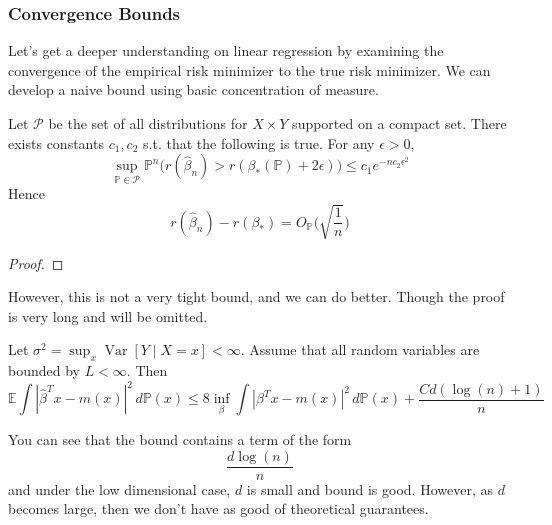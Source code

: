 \documentclass{article}
\DeclareMathOperator{\Var}{Var}
\begin{document}
    \subsubsection{Convergence Bounds} 

      Let's get a deeper understanding on linear regression by examining the convergence of the empirical risk minimizer to the true risk minimizer. We can develop a naive bound using basic concentration of measure. 

      \begin{theorem}
        Let $\mathcal{P}$ be the set of all distributions for $X \times Y$ supported on a compact set. There exists constants $c_1, c_2$ s.t. that the following is true. For any $\epsilon > 0$, 
        \begin{equation}
          \sup_{\mathbb{P} \in \mathcal{P}} \mathbb{P}^n \big( r(\hat{\beta}_n) > r (\beta_\ast (\mathbb{P}) + 2 \epsilon )\big) \leq c_1 e^{-n c_2 \epsilon^2}
        \end{equation}
        Hence 
        \begin{equation}
          r(\hat{\beta}_n ) - r(\beta_\ast) = O_{\mathbb{P}} \bigg( \sqrt{\frac{1}{n}} \bigg)
        \end{equation}
      \end{theorem} 
      \begin{proof}
        
      \end{proof}

      However, this is not a very tight bound, and we can do better. Though the proof is very long and will be omitted. 

      \begin{theorem} 
        Let $\sigma^2 = \sup_x \Var [Y \mid X = x] < \infty$. Assume that all random variables are bounded by $L < \infty$. Then 
        \begin{equation}
          \mathbb{E} \int |\hat{\beta}^T x - m(x) |^2 \, d\mathbb{P}(x) \leq 8 \inf_{\beta} \int |\beta^T x - m(x) |^2 \,d \mathbb{P}(x) + \frac{C d (\log(n) + 1)}{n}
        \end{equation}
      \end{theorem}

      You can see that the bound contains a term of the form 
      \begin{equation}
        \frac{d \log(n)}{n}
      \end{equation}
      and under the low dimensional case, $d$ is small and bound is good. However, as $d$ becomes large, then we don't have as good of theoretical guarantees. 
\end{document}
